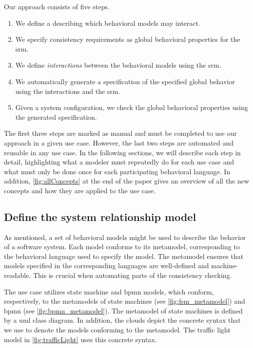 \documentclass{jot}
\begin{document}
Our approach consists of five steps.
\begin{enumerate}
    \item We define a \textit{} describing which behavioral models may interact.
    \item We specify consistency requirements as global behavioral properties for the \gls*{srm}.
    \item We define \textit{interactions} between the behavioral models using the \gls*{srm}.
    \item We automatically generate a specification of the specified global behavior using the interactions and the \gls*{srm}.
    \item Given a system configuration, we check the global behavioral properties using the generated specification.
\end{enumerate}
The first three steps are marked as manual and must be completed to use our approach in a given use case.
However, the last two steps are automated and reusable in any use case.
In the following sections, we will describe each step in detail, highlighting what a modeler must repeatedly do for each use case and what must only be done once for each participating behavioral language.
In addition, \cref{fig:allConcepts} at the end of the paper gives an overview of all the new concepts and how they are applied to the use case.


\subsection{Define the system relationship model}
As mentioned, a set of behavioral models might be used to describe the behavior of a software system.
Each model conforms to its metamodel, corresponding to the behavioral language used to specify the model.
The metamodel ensures that models specified in the corresponding languages are well-defined and machine-readable.
This is crucial when automating parts of the consistency checking.

The use case utilizes state machine and \gls*{bpmn} models, which conform, respectively, to the metamodels of state machines (see \cref{fig:fsm_metamodel}) and \gls*{bpmn} (see \cref{fig:bpmn_metamodel}).
The metamodel of state machines is defined by a \gls*{uml} class diagram.
In addition, the clouds depict the concrete syntax that we use to denote the models conforming to the metamodel.
The traffic light model in \cref{fig:trafficLight} uses this concrete syntax.
\end{document}
